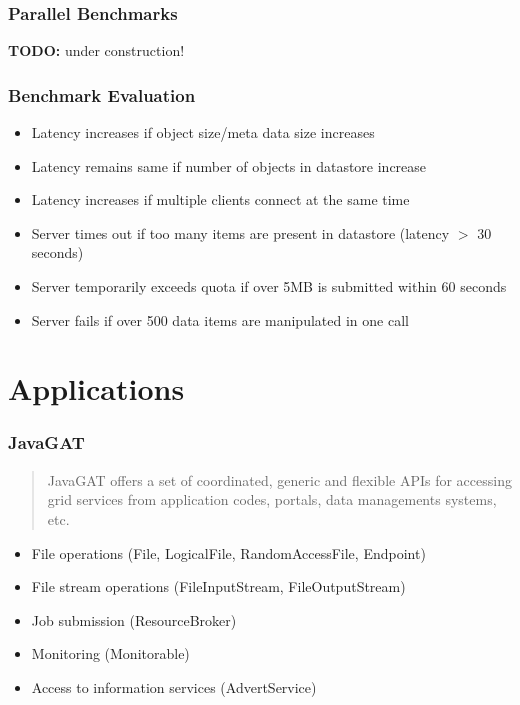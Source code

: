 \documentclass{beamer}
\begin{document}
\frame
{
	\frametitle{Parallel Benchmarks}
	\textbf{TODO:} under construction!
}

\frame
{
	\frametitle{Benchmark Evaluation}
	\begin{itemize}
    	\item Latency increases if object size/meta data size increases
    	\item Latency remains same if number of objects in datastore increase
    	\item Latency increases if multiple clients connect at the same time
    	\item Server times out if too many items are present in datastore (latency
    		$>$ 30 seconds)
    	\item Server temporarily exceeds quota if over 5MB is submitted within
    		60 seconds
    	\item Server fails if over 500 data items are manipulated in one call
    \end{itemize}
}

\section{Applications}
\frame
{
	\frametitle{JavaGAT}
	\begin{quote}
		JavaGAT offers a set of coordinated, generic and flexible APIs for accessing
		grid services from application codes, portals, data managements systems, etc.
	\end{quote}
	
	\begin{itemize}
		\item File operations (File, LogicalFile, RandomAccessFile, Endpoint)
		\item File stream operations (FileInputStream, FileOutputStream)
		\item Job submission (ResourceBroker)
		\item Monitoring (Monitorable)
		\item Access to information services (AdvertService)
	\end{itemize}
}
\end{document}
